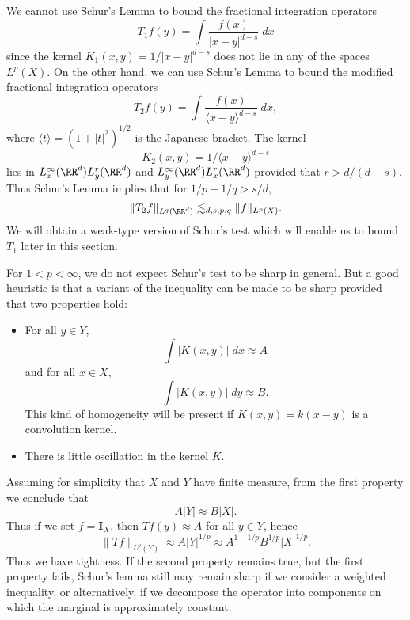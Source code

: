 \begin{example}
    We cannot use Schur's Lemma to bound the fractional integration operators
    \[ T_1f(y) = \int \frac{f(x)}{|x - y|^{d-s}}\; dx \]
    since the kernel $K_1(x,y) = 1/|x-y|^{d-s}$ does not lie in any of the spaces $L^p(X)$. On the other hand, we can use Schur's Lemma to bound the modified fractional integration operators
    \[ T_2 f(y) = \int \frac{f(x)}{\langle x - y \rangle^{d-s}}\; dx, \]
    where $\langle t \rangle = (1 + |t|^2)^{1/2}$ is the Japanese bracket. The kernel
    \[ K_2(x,y) = 1/\langle x - y \rangle^{d-s} \]
    lies in $L^\infty_x(\RR^d) L^r_y(\RR^d)$ and $L^\infty_y(\RR^d) L^r_x(\RR^d)$ provided that $r > d/(d-s)$. Thus Schur's Lemma implies that for $1/p - 1/q > s/d$,
    \[ \| T_2 f \|_{L^q(\RR^d)} \lesssim_{d,s,p,q} \| f \|_{L^p(X)}. \]
    We will obtain a weak-type version of Schur's test which will enable us to bound $T_1$ later in this section.
\end{example}

For $1 < p < \infty$, we do not expect Schur's test to be sharp in general. But a good heuristic is that a variant of the inequality can be made to be sharp provided that two properties hold:
%
\begin{itemize}
  \item For all $y \in Y$,
  \[ \int |K(x,y)|\; dx \approx A \]
  and for all $x \in X$,
  \[ \int |K(x,y)|\; dy \approx B. \]
  This kind of homogeneity will be present if $K(x,y) = k(x-y)$ is a convolution kernel.

  \item There is little oscillation in the kernel $K$.
\end{itemize}
%
Assuming for simplicity that $X$ and $Y$ have finite measure, from the first property we conclude that
%
\[ A |Y| \approx B |X|. \]
%
Thus if we set $f = \mathbf{I}_X$, then $Tf(y) \approx A$ for all $y \in Y$, hence
%
\[ \| Tf \|_{L^p(Y)} \approx A |Y|^{1/p} \approx A^{1 - 1/p} B^{1/p} |X|^{1/p}. \]
%
Thus we have tightness. If the second property remains true, but the first property fails, Schur's lemma still may remain sharp if we consider a weighted inequality, or alternatively, if we decompose the operator into components on which the marginal is approximately constant.

